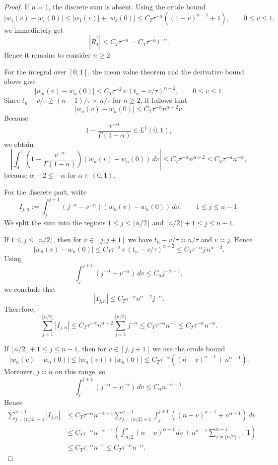 \documentclass[letterpaper]{article}
\numberwithin{equation}{section}
\theoremstyle{definition}
\theoremstyle{remark}
\begin{document}
\begin{proof}
If $n=1$, the discrete sum is absent. Using the crude bound
\[
  |w_1(v)-w_1(0)|
  \le |w_1(v)|+|w_1(0)|
  \le C_T\tau^{-\alpha}\left((1-v)^{\alpha-1}+1\right),
  \qquad 0\le v\le1,
\]
we immediately get
\[
  |\widetilde R_1^\tau|
  \le C_T\tau^{-\alpha}
  = C_T\tau^{-\alpha}1^{-\alpha}.
\]
Hence it remains to consider $n\ge2$.

For the integral over $[0,1]$, the mean value theorem and the derivative bound above give
\[
  |w_n(v)-w_n(0)|
  \le
  C_T\tau^{-2}\,v\,(t_n-v/\tau)^{\alpha-2},
  \qquad 0\le v\le1.
\]
Since $t_n-v/\tau\ge (n-1)/\tau\asymp n/\tau$ for $n\ge2$, it follows that
\[
  |w_n(v)-w_n(0)|
  \le
  C_T\tau^{-\alpha}n^{\alpha-2}v.
\]
Because
\[
  1-\frac{v^{-\alpha}}{\Gamma(1-\alpha)}\in L^1(0,1),
\]
we obtain
\[
  \left|
    \int_0^1\left(1-\frac{v^{-\alpha}}{\Gamma(1-\alpha)}\right)
    \left(w_n(v)-w_n(0)\right)\,dv
  \right|
  \le
  C_T\tau^{-\alpha}n^{\alpha-2}
  \le
  C_T\tau^{-\alpha}n^{-\alpha},
\]
because $\alpha-2\le -\alpha$ for $\alpha\in(0,1)$.

For the discrete part, write
\[
  I_{j,n}
  :=
  \int_j^{j+1}(j^{-\alpha}-v^{-\alpha})\left(w_n(v)-w_n(0)\right)\,dv,
  \qquad 1\le j\le n-1.
\]
We split the sum into the regions $1\le j\le \lfloor n/2\rfloor$ and
$\lfloor n/2\rfloor+1\le j\le n-1$.

If $1\le j\le \lfloor n/2\rfloor$, then for $v\in[j,j+1]$ we have
$t_n-v/\tau\asymp n/\tau$ and $v\asymp j$. Hence
\[
  |w_n(v)-w_n(0)|
  \le
  C_T\tau^{-2}\,v\,(t_n-v/\tau)^{\alpha-2}
  \le
  C_T\tau^{-\alpha}j\,n^{\alpha-2}.
\]
Using
\[
  \int_j^{j+1}(j^{-\alpha}-v^{-\alpha})\,dv
  \le C_\alpha j^{-\alpha-1},
\]
we conclude that
\[
  |I_{j,n}|
  \le
  C_T\tau^{-\alpha}n^{\alpha-2}j^{-\alpha}.
\]
Therefore,
\[
  \sum_{j=1}^{\lfloor n/2\rfloor}|I_{j,n}|
  \le
  C_T\tau^{-\alpha}n^{\alpha-2}
  \sum_{j=1}^{\lfloor n/2\rfloor}j^{-\alpha}
  \le
  C_T\tau^{-\alpha}n^{-1}
  \le
  C_T\tau^{-\alpha}n^{-\alpha}.
\]

If $\lfloor n/2\rfloor+1\le j\le n-1$, then for $v\in[j,j+1]$ we use the crude bound
\[
  |w_n(v)-w_n(0)|
  \le
  |w_n(v)|+|w_n(0)|
  \le
  C_T\tau^{-\alpha}\left((n-v)^{\alpha-1}+n^{\alpha-1}\right).
\]
Moreover, $j\asymp n$ on this range, so
\[
  \int_j^{j+1}(j^{-\alpha}-v^{-\alpha})\,dv
  \le C_\alpha n^{-\alpha-1}.
\]
Hence
\begin{align*}
  \sum_{j=\lfloor n/2\rfloor+1}^{n-1}|I_{j,n}|
  &\le
  C_T\tau^{-\alpha}n^{-\alpha-1}
  \sum_{j=\lfloor n/2\rfloor+1}^{n-1}
  \int_j^{j+1}\left((n-v)^{\alpha-1}+n^{\alpha-1}\right)\,dv
  \\
  &\le
  C_T\tau^{-\alpha}n^{-\alpha-1}
  \left(
    \int_{n/2}^{n}(n-v)^{\alpha-1}\,dv
    +n^{\alpha-1}\sum_{j=\lfloor n/2\rfloor+1}^{n-1}1
  \right)
  \\
  &\le
  C_T\tau^{-\alpha}n^{-1}
  \le
  C_T\tau^{-\alpha}n^{-\alpha}.
\end{align*}


\end{proof}
\end{document}
